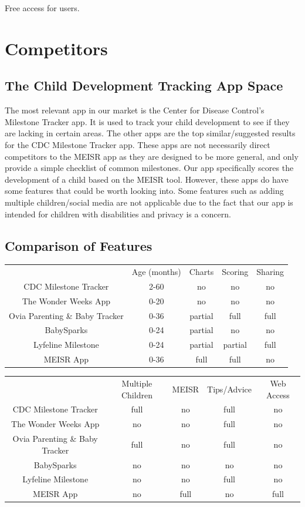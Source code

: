Free access for users.


\newpage


\chapter{Competitors}
\label{ch:Competitors}
\section{The Child Development Tracking App Space}
The most relevant app in our market is the Center for Disease Control’s Milestone Tracker app. It is used to track your child development to see if they are lacking in certain areas. The other apps are the top similar/suggested results for the CDC Milestone Tracker app. These apps are not necessarily direct competitors to the MEISR app as they are designed to be more general, and only provide a simple checklist of common milestones. Our app specifically scores the development of a child based on the MEISR tool. However, these apps do have some features that could be worth looking into. Some features such as adding multiple children/social media are not applicable due to the fact that our app is intended for children with disabilities and privacy is a concern.

\section{Comparison of Features}
\begin{center}
\begin{tabular}{ c c c c c}
  & Age (months) & Charts & Scoring & Sharing \\
 CDC Milestone Tracker & 2-60 & no & no & no\\
 The Wonder Weeks App & 0-20 & no & no & no\\
 Ovia Parenting \& Baby Tracker & 0-36 & partial & full & full\\
 BabySparks & 0-24 & partial & no & no\\
 Lyfeline Milestone & 0-24 & partial & partial & full\\
 MEISR App & 0-36 & full & full & no\\
\end{tabular}
\newline
\vspace*{.25 cm}
\newline
\begin{tabular}{ c c c c c}
  & Multiple Children & MEISR & Tips/Advice & Web Access\\
 CDC Milestone Tracker & full & no & full & no\\
 The Wonder Weeks App & no & no & full & no\\
 Ovia Parenting \& Baby Tracker & full & no & full & no\\
 BabySparks & no & no & no & no\\
 Lyfeline Milestone & no & no & full & no\\
 MEISR App & no & full & no & full\\
\end{tabular}
\end{center}

